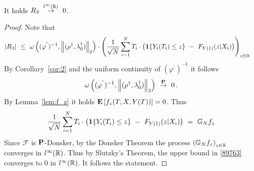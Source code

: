   
\begin{lemma}
  It holds
  $
    R_3
    \ 
    \overset{l^\infty(\R)}{\to}
    \ 
    0
  $.
\end{lemma}
\begin{proof}
Note that
\begin{align}
  \label{89763}
  \left| 
  R_3
  \right|
  &
  \
  \le
  \ 
  \omega
  \left( 
    (\varphi^{'})^{-1}
    ,
    \norm{(\rho^\dagger,\lambda_0^\dagger)}_2
  \right)
  \cdot
  \left( 
  \frac{1}{
  \sqrt{N}
  }
    \sum_{i=1}^{N} 
    T_i
    \cdot
    \left( 
    \mathbf{1}{\left\{ Y_i(T_i) \le z \right\}}
    \ 
    -
    \ 
  F_{Y(1)}(z|X_i)
  \right)
\right)_{z\in\R}
    \,
\end{align}
By Corollary~\ref{cor:2} and the uniform continuity of 
$
    (\varphi^{'})^{-1}
$ it follows 
\begin{align*}
  \omega
  \left( 
    (\varphi^{'})^{-1}
    ,
    \norm{(\rho^\dagger,\lambda_0^\dagger)}_2
  \right)
  \ 
  \overset{\P}{\to}
  \ 
  0
  \,.
\end{align*}
By Lemma~\ref{lem:f_z}
it holds 
$
\E \left[ f_z(T,X,Y(T)) \right]=0
$.
Thus
\begin{align*}
  \frac{1}{\sqrt{N}}
    \sum_{i=1}^{N} 
    T_i
    \cdot
    \left( 
    \mathbf{1}{\left\{ Y_i(T_i) \le z \right\}}
    \ 
    -
    \ 
  F_{Y(1)}(z|X_i)
    \right)
    \ 
    =
    \ 
    \G_N f_z
\end{align*}
Since $\mathcal{F}$ is $\P$-Donsker, by the Donsker Theorem
the process 
$
\left( 
\G_N f_z
\right)_{z\in\R}
$
converges in $l^\infty(\R)$.
Thus by Slutzky's Theorem, the upper bound in \eqref{89763} converges to 0 in $l^\infty(\R)$.
It follows the statement.
\end{proof}

